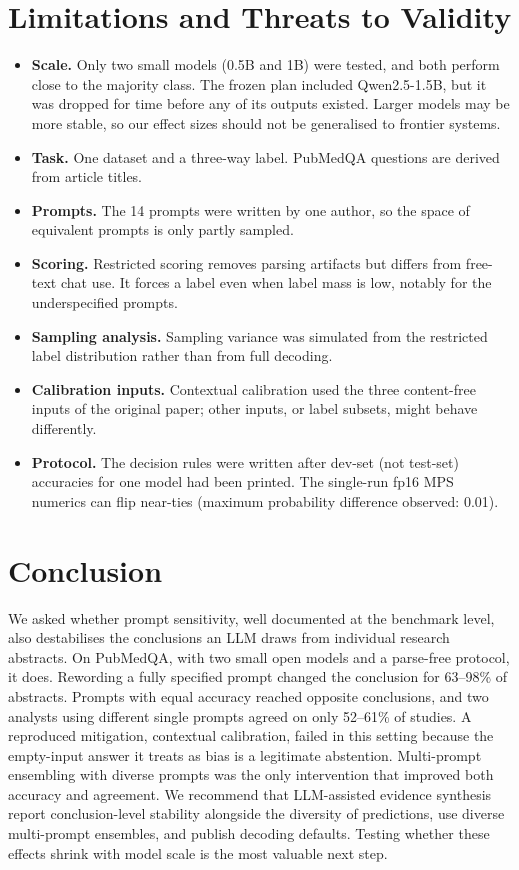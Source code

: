 \section{Limitations and Threats to Validity}
\label{sec:limits}
\begin{itemize}
  \item \textbf{Scale.} Only two small models (0.5B and 1B) were tested, and both perform close to the majority class. The frozen plan included Qwen2.5-1.5B, but it was dropped for time before any of its outputs existed. Larger models may be more stable, so our effect sizes should not be generalised to frontier systems.
  \item \textbf{Task.} One dataset and a three-way label. PubMedQA questions are derived from article titles.
  \item \textbf{Prompts.} The 14 prompts were written by one author, so the space of equivalent prompts is only partly sampled.
  \item \textbf{Scoring.} Restricted scoring removes parsing artifacts but differs from free-text chat use. It forces a label even when label mass is low, notably for the underspecified prompts.
  \item \textbf{Sampling analysis.} Sampling variance was simulated from the restricted label distribution rather than from full decoding.
  \item \textbf{Calibration inputs.} Contextual calibration used the three content-free inputs of the original paper; other inputs, or label subsets, might behave differently.
  \item \textbf{Protocol.} The decision rules were written after dev-set (not test-set) accuracies for one model had been printed. The single-run fp16 MPS numerics can flip near-ties (maximum probability difference observed: 0.01).
\end{itemize}

\section{Conclusion}
\label{sec:conclusion}
We asked whether prompt sensitivity, well documented at the benchmark level, also destabilises the conclusions an LLM draws from individual research abstracts. On PubMedQA, with two small open models and a parse-free protocol, it does. Rewording a fully specified prompt changed the conclusion for 63--98\% of abstracts. Prompts with equal accuracy reached opposite conclusions, and two analysts using different single prompts agreed on only 52--61\% of studies. A reproduced mitigation, contextual calibration, failed in this setting because the empty-input answer it treats as bias is a legitimate abstention. Multi-prompt ensembling with diverse prompts was the only intervention that improved both accuracy and agreement. We recommend that LLM-assisted evidence synthesis report conclusion-level stability alongside the diversity of predictions, use diverse multi-prompt ensembles, and publish decoding defaults. Testing whether these effects shrink with model scale is the most valuable next step.

